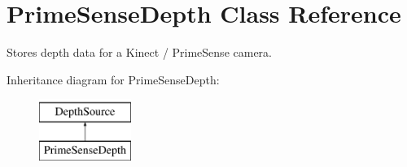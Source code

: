 \hypertarget{classfovis_1_1PrimeSenseDepth}{
\section{PrimeSenseDepth Class Reference}
\label{classfovis_1_1PrimeSenseDepth}
}


Stores depth data for a Kinect / PrimeSense camera.  


Inheritance diagram for PrimeSenseDepth:\begin{figure}[H]
\begin{center}
\leavevmode
\includegraphics[height=2.000000cm]{classfovis_1_1PrimeSenseDepth}
\end{center}
\end{figure}
